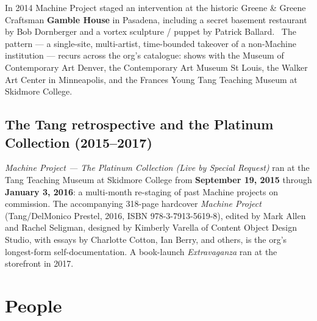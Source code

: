 \documentclass[10pt,letterpaper,twocolumn]{article}
\begin{document}
In 2014 Machine Project staged an intervention at the historic Greene \& Greene Craftsman \textbf{Gamble House} in Pasadena, including a secret basement restaurant by Bob Dornberger and a vortex sculpture / puppet by Patrick Ballard.~\citep{wikipediamachine} The pattern --- a single-site, multi-artist, time-bounded takeover of a non-Machine institution --- recurs across the org's catalogue: shows with the Museum of Contemporary Art Denver, the Contemporary Art Museum St Louis, the Walker Art Center in Minneapolis, and the Frances Young Tang Teaching Museum at Skidmore College.~\citep{calarts2010,tangbook}

\subsection{The Tang retrospective and the Platinum Collection (2015--2017)}

\emph{Machine Project --- The Platinum Collection (Live by Special Request)} ran at the Tang Teaching Museum at Skidmore College from \textbf{September 19, 2015} through \textbf{January 3, 2016}: a multi-month re-staging of past Machine projects on commission. The accompanying 318-page hardcover \emph{Machine Project} (Tang/DelMonico Prestel, 2016, ISBN 978-3-7913-5619-8), edited by Mark Allen and Rachel Seligman, designed by Kimberly Varella of Content Object Design Studio, with essays by Charlotte Cotton, Ian Berry, and others, is the org's longest-form self-documentation. A book-launch \emph{Extravaganza} ran at the storefront in 2017.~\citep{tangbook,platinumbook,tangpress}

\section{People}
\end{document}

